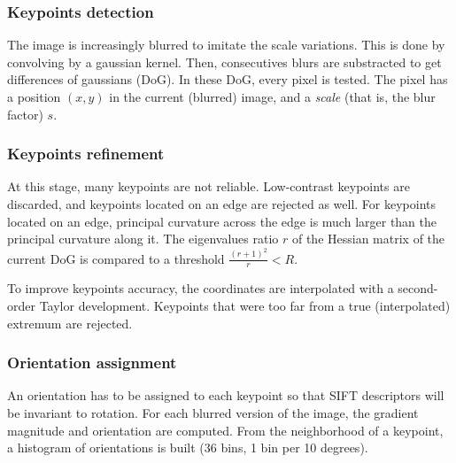 \documentclass[preprint]{iucr}
\begin{document}
\subsubsection{Keypoints detection}
The image is increasingly blurred to imitate the scale variations. This is done by convolving by a gaussian kernel. Then, consecutives blurs are substracted to get differences of gaussians (DoG). In these DoG, every pixel is tested. The pixel has a position $(x,y)$ in the current (blurred) image, and a \textit{scale} (that is, the blur factor) $s$.



\subsubsection{Keypoints refinement}
At this stage, many keypoints are not reliable. Low-contrast keypoints are discarded, and keypoints located on an edge are rejected as well. For keypoints located on an edge, principal curvature across the edge is much larger than the principal curvature along it. The eigenvalues ratio $r$ of the Hessian matrix of the current DoG is compared to a threshold $\frac{(r+1)^2}{r} < R$.

To improve keypoints accuracy, the coordinates are interpolated with a second-order Taylor development.
Keypoints that were too far from a true (interpolated) extremum are rejected.


\subsubsection{Orientation assignment}
An orientation has to be assigned to each keypoint so that SIFT descriptors will be invariant to rotation. For each blurred version of the image, the gradient magnitude and orientation are computed. From the neighborhood of a keypoint, a histogram of orientations is built (36 bins, 1 bin per 10 degrees).
\end{document}
